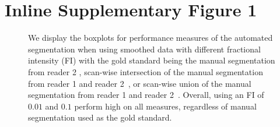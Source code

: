 \documentclass{elsarticle}\usepackage[]{graphicx}\usepackage[]{color}
\begin{document}
\section*{Inline Supplementary Figure 1}
\begin{figure}[H]
\hfill
\hfill
\caption{We display the boxplots for performance measures of the automated segmentation when using smoothed data with different fractional intensity (FI) with the gold standard being the manual segmentation from reader 2 \protect{}, scan-wise intersection of the manual segmentation from reader 1 and reader 2~\protect{}, or scan-wise union of the manual segmentation from reader 1 and reader 2~\protect{}.  Overall, using an FI of $0.01$ and $0.1$ perform high on all measures, regardless of manual segmentation used as the gold standard. }
\label{fig:union_intersect}
\end{figure}
\end{document}
